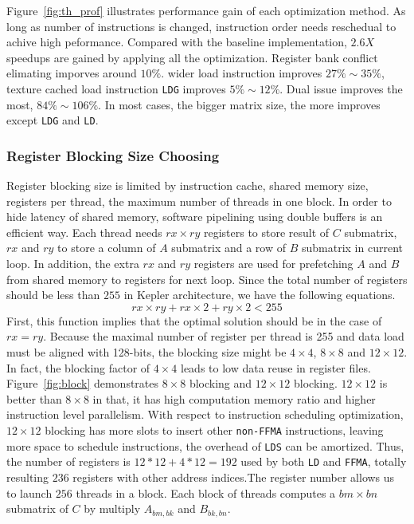 \documentclass{sig-alternate-05-2015}
\begin{document}
Figure~\ref{fig:th_prof} illustrates performance gain of each optimization method.
As long as number of instructions is changed, instruction order needs reschedual to achive high peformance.
Compared with the baseline implementation, $2.6X$ speedups are gained by applying all the optimization.
Register bank conflict elimating imporves around $10\%$. wider load instruction improves $27\%\sim35\%$, texture cached
load instruction {\tt LDG} improves $5\%\sim12\%$. Dual issue improves the most, $84\%\sim106\%$. In most cases, the bigger matrix
size, the more improves except {\tt LDG} and {\tt LD}.

\subsubsection{Register Blocking Size Choosing}

Register blocking size is limited by instruction cache, shared memory size, registers per thread, the maximum number of threads in one block.
In order to hide latency of shared memory, software pipelining using double
buffers is an efficient way. Each thread needs $rx\times ry$ registers to store result of $C$ submatrix, $rx$ and $ry$ to store a column of $A$
submatrix and a row of $B$ submatrix in current loop. In addition, the extra $rx$ and $ry$ registers are used for prefetching $A$ and $B$ from shared memory to
registers for next loop. Since the total number of registers should be less than $255$ in Kepler architecture, we have the following equations.
\begin{equation}
    rx\times ry + rx\times 2 + ry\times 2 < 255
\label{f_register}
\end{equation}
First, this function implies that the optimal solution should be in the case of $rx=ry$. Because the maximal number of register per thread is 255 and data load must be aligned with 128-bits, the blocking size might be $4\times 4$, $8\times 8$ and $12\times 12$. In fact, the blocking factor of $4\times 4$ leads to low data reuse in register files. Figure~\ref{fig:block} demonstrates $8\times8$ blocking and $12\times12$ blocking. $12\times12$ is better than
$8\times8$ in that, it has high computation memory ratio and higher instruction level parallelism. With respect to instruction scheduling optimization, $12\times12$ blocking has more slots to insert other {\tt non-FFMA} instructions, leaving more
space to schedule instructions, the overhead of {\tt LDS} can be amortized. Thus, the number of registers is $12*12+4*12=192$ used by both {\tt LD} and {\tt FFMA}, totally resulting $236$ registers with other address indices.The register number allows us to launch $256$ threads in a block. Each block of threads computes a $bm\times bn$ submatrix of $C$ by multiply $A_{bm,bk}$ and $B_{bk,
bn}$.
\end{document}
